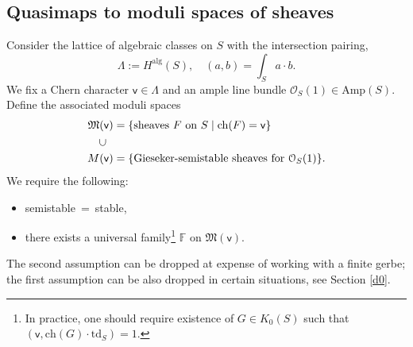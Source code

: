 \documentclass[11pt, reqno]{amsart}
\theoremstyle{plain}
\theoremstyle{definition}
\theoremstyle{remark}
\newcommand{\BF}{{\mathbb{F}}}
\newcommand{\CO}{{\mathcal O}}
\newcommand{\FM}{{\mathfrak{M}}}
\newcommand{\vsf}{{\mathsf{v}}}
\newcommand{\ch}{{\mathrm{ch}}}
\newcommand{\td}{\mathrm{td}}
\begin{document}
\subsection{Quasimaps to moduli spaces of sheaves} 
Consider the lattice of algebraic classes on $S$ with the intersection pairing,
\[\Lambda := H^{\mathrm{alg}}(S), \quad  (a, b)= \int_S a\cdot b.\] 
 We fix a Chern character $\vsf \in \Lambda$ and an ample line bundle $\CO_S(1) \in \mathrm{Amp}(S)$. Define the associated moduli spaces 
 \begin{align*}
 \FM&(\vsf)=\{\text{sheaves } F \text{ on } S \mid \ch(F)=\vsf \}  \\
&\rotatebox[origin=c]{90}{$\subset$}   \\ 
 M&(\vsf)=\{ \text{Gieseker-semistable sheaves for } \CO_S(1)\}.
 \end{align*}
 We require the following:
\begin{itemize}
	\item semistable\ =\ stable,
	\item there exists a universal family\footnote{ In practice, one should require existence of $G \in K_0(S)$ such that $(\vsf,\ch(G)\cdot \td_S)=1$. } $\BF$ on $\FM(\vsf)$. 
	\end{itemize}
The second assumption can be dropped at expense of working with a finite gerbe; the first assumption can be also dropped in certain situations, see Section \ref{d0}.
\end{document}
